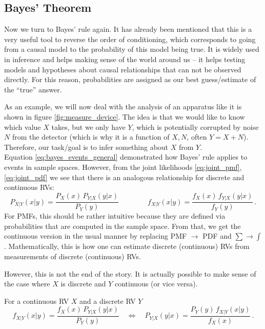 	\subsection{Bayes' Theorem}
Now we turn to Bayes' rule again. It has already been mentioned that this is a very useful tool to reverse the order of conditioning, which corresponds to going from a causal model to the probability of this model being true. It is widely used in inference and helps making sense of the world around us -- it helps testing models and hypotheses about causal relationships that can not be observed directly. For this reason, probabilities are assigned as our best guess/estimate of the \enquote{true} answer.

As an example, we will now deal with the analysis of an apparatus like it is shown in figure \ref{fig:measure_device}. The idea is that we would like to know which value $X$ takes, but we only have $Y$, which is potentially corrupted by noise $N$ from the detector (which is why it is a function of $X, N$, often $Y = X + N$). Therefore, our task/goal is to infer something about $X$ from $Y$.\\



Equation \eqref{eq:bayes_events_general} demonstrated how Bayes' rule applies to events in sample spaces. However, from the joint likelihoods \eqref{eq:joint_pmf}, \eqref{eq:joint_pdf} we see that there is an analogous relationship for discrete and continuous RVs:
\begin{equation}
P_{X | Y}(x |  y) = \frac{P_X(x) \, P_{Y | X}(y | x)}{P_Y(y)} \qquad \qquad f_{X | Y}(x |  y) = \frac{f_X(x) \, f_{Y | X}(y | x)}{f_Y(y)} \, .
\end{equation}
For PMFs, this should be rather intuitive because they are defined via probabilities that are computed in the sample space. From that, we get the continuous version in the usual manner by replacing PMF $\rightarrow$ PDF and $\sum \rightarrow \int$. Mathematically, this is how one can estimate discrete (continuous) RVs from measurements of discrete (continuous) RVs.

However, this is not the end of the story. It is actually possible to make sense of the case where $X$ is discrete and $Y$ continuous (or vice versa).
\begin{prop}
For a continuous RV $X$ and a discrete RV $Y$
\begin{equation}
f_{X | Y}(x | y) = \frac{f_X(x) \, P_{Y | X}(y | x)}{P_Y(y)} \quad \Leftrightarrow \quad P_{Y | X}(y | x) = \frac{P_Y(y) \, f_{X | Y}(x | y)}{f_X(x)} \, .
\end{equation}
\end{prop}


